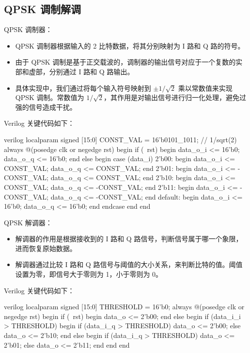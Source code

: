 \subsection{QPSK 调制解调}

QPSK 调制器：

\begin{itemize} 
    \item QPSK 调制器根据输入的 2 比特数据，将其分别映射为 I 路和 Q 路的符号。
    \item 由于 QPSK 调制是基于正交载波的，调制器的输出信号对应于一个复数的实部和虚部，分别通过 I 路和 Q 路输出。
    \item 具体实现中，我们通过将每个输入符号映射到 $\pm 1/\sqrt{2}$ 乘以常数值来实现 QPSK 调制。常数值为 $1/\sqrt{2}$，其作用是对输出信号进行归一化处理，避免过强的信号造成干扰。
\end{itemize}

Verilog 关键代码如下：

\begin{codeblock}{verilog}
localparam signed [15:0] CONST_VAL = 16'b0101_1011;  // 1/sqrt(2)
always @(posedge clk or negedge rst) begin
    if (~rst) begin
        data_o_i <= 16'b0;  data_o_q <= 16'b0;
    end else begin
        case (data_i)
            2'b00: begin
                data_o_i <= CONST_VAL;  data_o_q <= CONST_VAL;
            end
            2'b01: begin
                data_o_i <= -CONST_VAL; data_o_q <= CONST_VAL;
            end
            2'b10: begin
                data_o_i <= CONST_VAL;  data_o_q <= -CONST_VAL;
            end
            2'b11: begin
                data_o_i <= -CONST_VAL; data_o_q <= -CONST_VAL;
            end
            default: begin
                data_o_i <= 16'b0;      data_o_q <= 16'b0;
            end
        endcase
    end
end
\end{codeblock}

QPSK 解调器：

\begin{itemize} 
    \item 解调器的作用是根据接收到的 I 路和 Q 路信号，判断信号属于哪一个象限，进而恢复原始数据。
    \item 解调器通过比较 I 路和 Q 路信号与阈值的大小关系，来判断比特的值。阈值设置为零，即信号大于零则为 1，小于零则为 0。
\end{itemize}

Verilog 关键代码如下：

\begin{codeblock}{verilog}
localparam signed [15:0] THRESHOLD = 16'b0;
always @(posedge clk or negedge rst) begin
    if (~rst) begin
        data_o <= 2'b00;
    end else begin
        if (data_i_i > THRESHOLD) begin
            if (data_i_q > THRESHOLD)   data_o <= 2'b00;
            else                        data_o <= 2'b10;
        end else begin
            if (data_i_q > THRESHOLD)   data_o <= 2'b01;
            else                        data_o <= 2'b11;
        end
    end
end
\end{codeblock}





